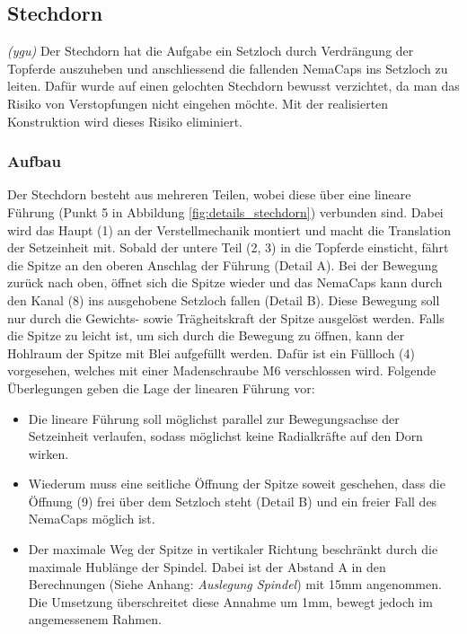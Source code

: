 \subsection{Stechdorn}
\textit{(ygu)} Der Stechdorn hat die Aufgabe ein Setzloch durch Verdrängung der Topferde auszuheben und anschliessend die fallenden NemaCaps ins Setzloch zu leiten. Dafür wurde auf einen gelochten Stechdorn bewusst verzichtet, da man das Risiko von Verstopfungen nicht eingehen möchte. Mit der realisierten Konstruktion wird dieses Risiko eliminiert. 
\newline

\subsubsection{Aufbau}
Der Stechdorn besteht aus mehreren Teilen, wobei diese über eine lineare Führung (Punkt 5 in Abbildung \ref{fig:details_stechdorn}) verbunden sind. Dabei wird das Haupt (1) an der Verstellmechanik montiert und macht die Translation der Setzeinheit mit. Sobald der untere Teil (2, 3) in die Topferde einsticht, fährt die Spitze an den oberen Anschlag der Führung (Detail A). Bei der Bewegung zurück nach oben, öffnet sich die Spitze wieder und das NemaCaps kann durch den Kanal (8) ins ausgehobene Setzloch fallen (Detail B). Diese Bewegung soll nur durch die Gewichts- sowie Trägheitskraft der Spitze ausgelöst werden. Falls die Spitze zu leicht ist, um sich durch die Bewegung zu öffnen, kann der Hohlraum der Spitze mit Blei aufgefüllt werden. Dafür ist ein Füllloch (4) vorgesehen, welches mit einer Madenschraube M6 verschlossen wird.
\newline
Folgende Überlegungen geben die Lage der linearen Führung vor:
\begin{itemize}
	\item Die lineare Führung soll möglichst parallel zur Bewegungsachse der Setzeinheit verlaufen, sodass möglichst keine Radialkräfte auf den Dorn wirken.
	
	\item Wiederum muss eine seitliche Öffnung der Spitze soweit geschehen, dass die Öffnung (9) frei über dem Setzloch steht (Detail B) und ein freier Fall des NemaCaps möglich ist.
	
	\item Der maximale Weg der Spitze in vertikaler Richtung beschränkt durch die maximale Hublänge der Spindel. Dabei ist der Abstand A in den Berechnungen (Siehe Anhang: \textit{Auslegung Spindel}) mit 15mm angenommen. Die Umsetzung überschreitet diese Annahme um 1mm, bewegt jedoch im angemessenem Rahmen.
\end{itemize}

